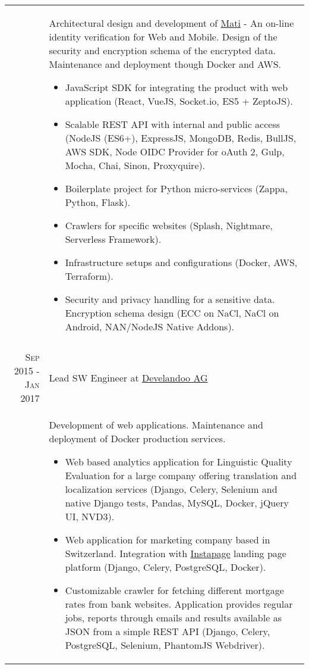 \documentclass[a4paper,10pt]{article}
\begin{document}
\begin{tabular}{r|p{11cm}}
& \footnotesize{ Architectural design and development of \href{https://www.getmati.com/}{Mati} - An on-line identity verification
for Web and Mobile. Design of the security and encryption schema of the encrypted data. Maintenance and deployment though Docker and AWS.

  \begin{itemize}
    \item JavaScript SDK for integrating the product with web application
      (React, VueJS, Socket.io, ES5 + ZeptoJS).
    \item Scalable REST API with internal and public access
      (NodeJS (ES6+), ExpressJS, MongoDB, Redis, BullJS, AWS SDK, Node OIDC
      Provider for oAuth 2, Gulp, Mocha, Chai, Sinon, Proxyquire).
    \item Boilerplate project for Python micro-services (Zappa, Python, Flask).
    \item Crawlers for specific websites (Splash, Nightmare, Serverless
    Framework).
    \item Infrastructure setups and configurations (Docker, AWS, Terraform).
    \item Security and privacy handling for a sensitive data. Encryption
    schema design (ECC on NaCl, NaCl on Android, NAN/NodeJS Native Addons).
  \end{itemize}
} \\


\multicolumn{2}{c}{} \\


\textsc{Sep 2015 - Jan 2017}
  & Lead SW Engineer at
    \href{http://www.develandoo.com/}{Develandoo AG} \\

& \footnotesize{ Development of web applications. Maintenance and deployment
of Docker production services.
  \begin{itemize}
    \item Web based analytics application for Linguistic Quality Evaluation
    for a large company offering translation and localization services
    (Django, Celery, Selenium and native Django tests, Pandas, MySQL, Docker,
    jQuery UI, NVD3).
    \item Web application for marketing company based in Switzerland.
    Integration with \href{https://instapage.com/}{Instapage} landing page
    platform (Django, Celery, PostgreSQL, Docker).
    \item Customizable crawler for fetching different mortgage rates from bank
    websites. Application provides regular jobs, reports through emails and
    results available as JSON from a simple REST API (Django, Celery,
    PostgreSQL, Selenium, PhantomJS Webdriver).
  \end{itemize}
} \\


\end{tabular}
\end{document}
